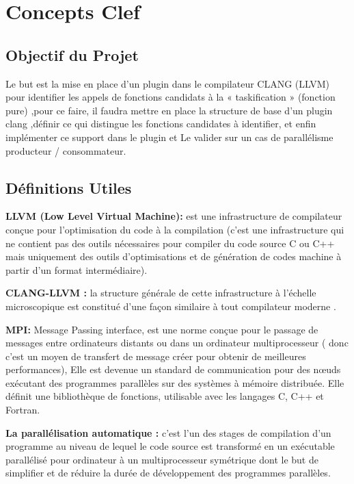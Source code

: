 \documentclass[12pt,a4paper]{article}
\begin{document}
\section{Concepts Clef}

\subsection{Objectif du Projet}

Le but est la mise en place d’un plugin dans le compilateur CLANG (LLVM) pour identifier les appels de fonctions candidats à la « taskification » (fonction pure) ,pour ce faire, il faudra mettre en place la structure de base d’un plugin clang ,définir ce qui distingue les fonctions candidates à identifier, et enfin implémenter ce support dans le plugin et  Le valider sur un cas de parallélisme producteur / consommateur.

\subsection{Définitions Utiles} 
	
\textbf{ LLVM (Low Level Virtual Machine):} est une infrastructure de compilateur conçue pour l'optimisation du code à la compilation (c’est une infrastructure qui ne contient pas des outils nécessaires pour compiler du code source C ou C++ mais uniquement des outils d’optimisations et de génération de codes machine à partir d’un format intermédiaire).\cite{clangllvm}
              
\textbf{CLANG-LLVM :} la structure générale de cette infrastructure à l’échelle microscopique est constitué d’une façon similaire à tout compilateur moderne .\cite{clangllvm}


\textbf{ MPI:} Message Passing interface, est une norme conçue pour le passage de messages entre ordinateurs distants ou dans un ordinateur multiprocesseur ( donc c’est un moyen de transfert de message créer pour obtenir de meilleures performances), Elle est devenue un standard de communication pour des nœuds exécutant des programmes parallèles sur des systèmes à mémoire distribuée. Elle définit une bibliothèque de fonctions, utilisable avec les langages C, C++ et Fortran.\cite{wiki}


\textbf{ La parallélisation automatique :} c’est l’un des stages de compilation d’un programme au niveau de lequel le code source est transformé  en un exécutable parallélisé pour ordinateur à un multiprocesseur symétrique dont le but de simplifier et de réduire la durée de développement des programmes parallèles.\cite{wiki}
\end{document}
